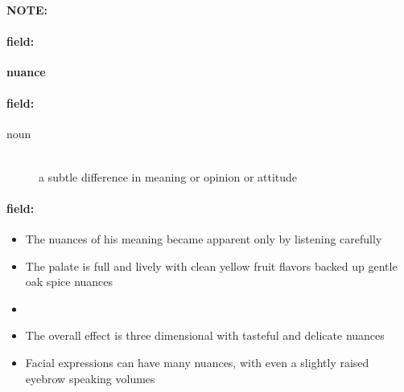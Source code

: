 \documentclass[12pt]{article}
\newenvironment{note}{\paragraph{NOTE:}}{}
\newenvironment{field}{\paragraph{field:}}{}
\begin{document}
\begin{note}
\begin{field}
\textbf{\large nuance}
\end{field}


\begin{field}
\begin{description}
\item[noun] \hfill \\ 
a subtle difference in meaning or opinion or attitude

\end{description}
\end{field}

\begin{field}
\begin{itemize}
\item The nuances of his meaning became apparent only by listening carefully
\item The palate is full and lively with clean yellow fruit flavors backed up gentle oak spice nuances
\item 
\item The overall effect is three dimensional with tasteful and delicate nuances
\item Facial expressions can have many nuances, with even a slightly raised eyebrow speaking volumes
\end{itemize}
\end{field}
\end{note}
\end{document}
